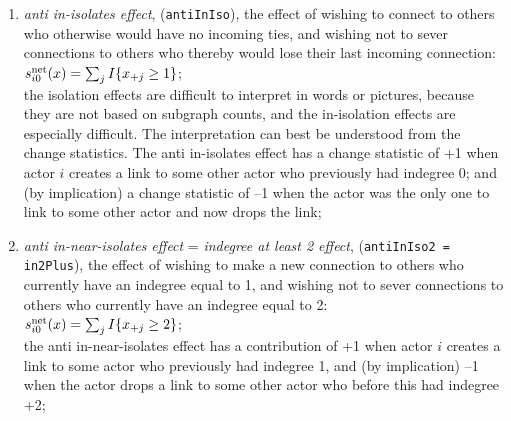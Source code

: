 \documentclass[a4paper,fleqn,11pt]{article}
\newcommand{\+}{\, + \,}
\newcommand{\rs}{{\sf RSiena}}
\newcommand{\vit}{\theenumi}
\begin{document}
\begin{enumerate}

\item \emph{anti in-isolates effect}, (\texttt{antiInIso}), the effect of
      wishing to connect to others who otherwise would have
      no incoming ties, and wishing not to sever connections to
      others who thereby would lose their last incoming connection: \\
$s^{\rm net}_{i\vit}(x) = \sum_j I\{x_{+j} \geq 1 \} $;\\
     the isolation effects are difficult to interpret in words or pictures,
     because they are not based on subgraph counts, and the in-isolation
     effects are especially difficult.
     The interpretation can best be understood from the change statistics.
     The anti in-isolates effect has a change statistic of +1 when actor $i$
     creates a link to some other actor who previously had indegree 0; and
     (by implication) a change statistic of --1 when the actor was the only one to link to some
     other actor and now drops the link;

\item \emph{anti in-near-isolates effect}
 = \emph{indegree at least 2 effect}, (\texttt{antiInIso2 = in2Plus}),
      the effect of
      wishing to make a new connection to others who currently have
      an indegree equal to 1, and wishing not to sever connections to
      others who currently have an indegree equal to 2:\\
$s^{\rm net}_{i\vit}(x) = \sum_j I\{x_{+j} \geq 2 \} $;\\
    the anti in-near-isolates effect has a contribution of +1 when actor $i$
     creates a link to some actor who previously had indegree 1, and
     (by implication) --1 when the actor drops a link to some
     other actor who before this had indegree +2;


\end{enumerate}
\end{document}
